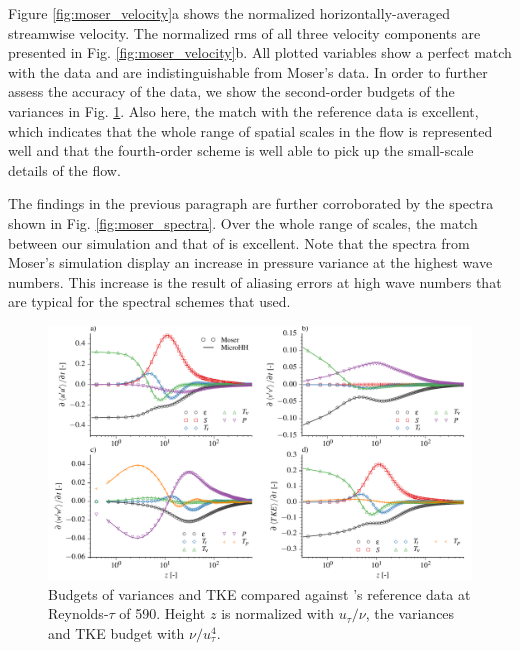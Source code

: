 \documentclass[gmd,manuscript]{copernicus}
\begin{document}
Figure \ref{fig:moser_velocity}a shows the normalized horizontally-averaged streamwise velocity. The normalized rms of all three velocity components are presented in Fig. \ref{fig:moser_velocity}b. All plotted variables show a perfect match with the data and are indistinguishable from Moser's data. In order to further assess the accuracy of the data, we show the second-order budgets of the variances in Fig. \ref{fig:moser_budget}. Also here, the match with the reference data is excellent, which indicates that the whole range of spatial scales in the flow is represented well and that the fourth-order scheme is well able to pick up the small-scale details of the flow.

The findings in the previous paragraph are further corroborated by the spectra shown in Fig. \ref{fig:moser_spectra}.  Over the whole range of scales, the match between our simulation and that of \citet{Moser1999} is excellent. Note that the spectra from Moser's simulation display an increase in pressure variance at the highest wave numbers. This increase is the result of aliasing errors at high wave numbers that are typical for the spectral schemes that \citet{Moser1999} used.

\begin{figure}[t]
\vspace*{2mm}
\begin{center}
\includegraphics[width=16.6cm]{figs/gmd_m590_turb_budg.pdf}
\end{center}
\caption{Budgets of variances and TKE compared against \citet{Moser1999}'s reference data at Reynolds-$\tau$ of 590. Height $z$ is normalized with $u_\tau / \nu$, the variances and TKE budget with $\nu / u_\tau^{4}$.}\label{fig:moser_budget}
\end{figure}
\end{document}
